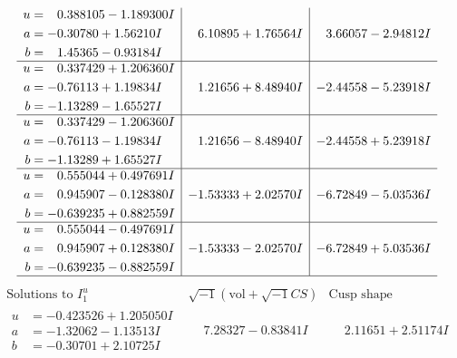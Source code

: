 \documentclass[1p]{elsarticle_modified}
\theoremstyle{definition}
\newcommand{\I}{\sqrt{-1}}
\begin{document}
$$\begin{array}{c|c|c}
\begin{aligned}
u &= \phantom{-}0.388105 - 1.189300 I \\
a &= -0.30780 + 1.56210 I \\
b &= \phantom{-}1.45365 - 0.93184 I\end{aligned}
 & \phantom{-}6.10895 + 1.76564 I & \phantom{-}3.66057 - 2.94812 I \\ \hline\begin{aligned}
u &= \phantom{-}0.337429 + 1.206360 I \\
a &= -0.76113 + 1.19834 I \\
b &= -1.13289 - 1.65527 I\end{aligned}
 & \phantom{-}1.21656 + 8.48940 I & -2.44558 - 5.23918 I \\ \hline\begin{aligned}
u &= \phantom{-}0.337429 - 1.206360 I \\
a &= -0.76113 - 1.19834 I \\
b &= -1.13289 + 1.65527 I\end{aligned}
 & \phantom{-}1.21656 - 8.48940 I & -2.44558 + 5.23918 I \\ \hline\begin{aligned}
u &= \phantom{-}0.555044 + 0.497691 I \\
a &= \phantom{-}0.945907 - 0.128380 I \\
b &= -0.639235 + 0.882559 I\end{aligned}
 & -1.53333 + 2.02570 I & -6.72849 - 5.03536 I \\ \hline\begin{aligned}
u &= \phantom{-}0.555044 - 0.497691 I \\
a &= \phantom{-}0.945907 + 0.128380 I \\
b &= -0.639235 - 0.882559 I\end{aligned}
 & -1.53333 - 2.02570 I & -6.72849 + 5.03536 I\\
 \hline 
 \end{array}$$\newpage$$\begin{array}{c|c|c}  
\text{Solutions to }I^u_{1}& \I (\text{vol} + \sqrt{-1}CS) & \text{Cusp shape}\\
 \hline 
\begin{aligned}
u &= -0.423526 + 1.205050 I \\
a &= -1.32062 - 1.13513 I \\
b &= -0.30701 + 2.10725 I\end{aligned}
 & \phantom{-}7.28327 - 0.83841 I & \phantom{-}2.11651 + 2.51174 I \\ \hline\begin{aligned}

\end{aligned}
\end{array}$$
\end{document}
